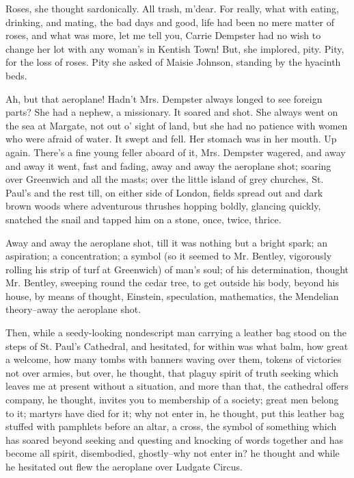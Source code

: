 \documentclass[lang=cn,10pt]{elegantbook}
\begin{document}
Roses, she thought sardonically.  All trash, m'dear.  For really,
what with eating, drinking, and mating, the bad days and good, life
had been no mere matter of roses, and what was more, let me tell
you, Carrie Dempster had no wish to change her lot with any woman's
in Kentish Town!  But, she implored, pity.  Pity, for the loss of
roses.  Pity she asked of Maisie Johnson, standing by the hyacinth
beds.

Ah, but that aeroplane!  Hadn't Mrs. Dempster always longed to see
foreign parts?  She had a nephew, a missionary.  It soared and
shot.  She always went on the sea at Margate, not out o' sight of
land, but she had no patience with women who were afraid of water.
It swept and fell.  Her stomach was in her mouth.  Up again.
There's a fine young feller aboard of it, Mrs. Dempster wagered,
and away and away it went, fast and fading, away and away the
aeroplane shot; soaring over Greenwich and all the masts; over the
little island of grey churches, St. Paul's and the rest till, on
either side of London, fields spread out and dark brown woods where
adventurous thrushes hopping boldly, glancing quickly, snatched the
snail and tapped him on a stone, once, twice, thrice.

Away and away the aeroplane shot, till it was nothing but a bright
spark; an aspiration; a concentration; a symbol (so it seemed to
Mr. Bentley, vigorously rolling his strip of turf at Greenwich) of
man's soul; of his determination, thought Mr. Bentley, sweeping
round the cedar tree, to get outside his body, beyond his house, by
means of thought, Einstein, speculation, mathematics, the Mendelian
theory--away the aeroplane shot.

Then, while a seedy-looking nondescript man carrying a leather bag
stood on the steps of St. Paul's Cathedral, and hesitated, for
within was what balm, how great a welcome, how many tombs with
banners waving over them, tokens of victories not over armies, but
over, he thought, that plaguy spirit of truth seeking which leaves
me at present without a situation, and more than that, the
cathedral offers company, he thought, invites you to membership of
a society; great men belong to it; martyrs have died for it; why
not enter in, he thought, put this leather bag stuffed with
pamphlets before an altar, a cross, the symbol of something which
has soared beyond seeking and questing and knocking of words
together and has become all spirit, disembodied, ghostly--why not
enter in? he thought and while he hesitated out flew the aeroplane
over Ludgate Circus.
\end{document}
